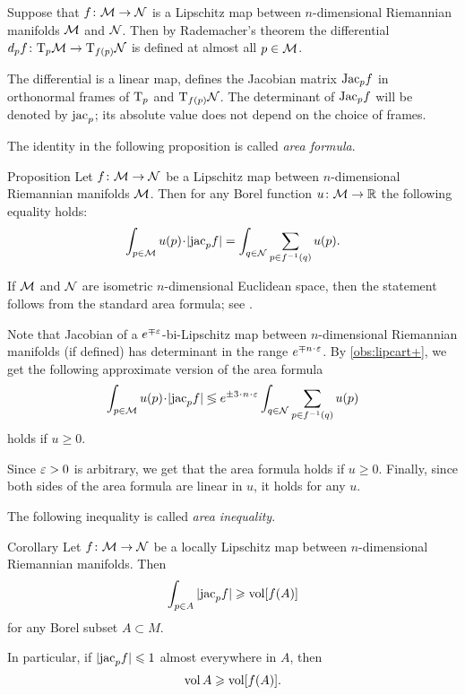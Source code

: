 Suppose that $f\colon\mathcal{M}\to\mathcal{N}$ is a Lipschitz map between $n$-dimensional Riemannian manifolds $\mathcal{M}$ and $\mathcal{N}$.
Then by Rademacher's theorem %
the differential $d_p f\colon\mathrm{T}_p\mathcal{M}\to\mathrm{T}_{f(p)}\mathcal{N}$ is defined at almost all $p\in \mathcal{M}$.

The differential is a linear map, defines the Jacobian matrix $\mathrm{Jac}_pf$ in orthonormal frames of $\mathrm{T}_p$ and $\mathrm{T}_{f(p)}\mathcal{N}$.
The determinant of $\mathrm{Jac}_pf$ will be denoted by $\mathrm{jac}_p$;
its absolute value does not depend on the choice of frames.

The identity in the following proposition is called \emph{area formula}.

\begin{thm}{Proposition}
Let $f\colon\mathcal{M}\to\mathcal{N}$ be a Lipschitz map between $n$-dimensional Riemannian manifolds $\mathcal{M}$.
Then for  any Borel function $u\:\spc{M}\z\to \RR$ the following equality holds:
\[\int_{p\in \spc{M}} u(p)\cdot |\jac_pf|=\int_{q\in \spc{N}}\sum_{p\in f^{-1}(q)} u(p).\]

\end{thm}

If $\mathcal{M}$ and $\mathcal{N}$ are isometric $n$-dimensional Euclidean space, then the statement follows from the standard area formula;
see \cite[3.2.3]{federer}.

Note that Jacobian of a $e^{\mp\varepsilon}$-bi-Lipschitz map between $n$-dimensional Riemannian manifolds (if defined) has determinant in the range $e^{\mp n\cdot\eps}$.
By \ref{obs:lipcart+}, we get the following approximate version of the area formula 
\[\int_{p\in \spc{M}} u(p)\cdot |\jac_pf|
\lege e^{\pm 3\cdot n\cdot \eps}\int_{q\in \spc{N}}\sum_{p\in f^{-1}(q)} u(p)\]
holds if $u\ge0$.

Since $\varepsilon>0$ is arbitrary, we get that the area formula holds if $u\ge 0$.
Finally, since both sides of the area formula are linear in $u$, it holds for any $u$.
\qeds

The following inequality is called \emph{area inequality}.

\begin{thm}{Corollary}\label{cor:area-inequality}
Let $f\colon\mathcal{M}\to\mathcal{N}$ be a locally Lipschitz map between $n$-dimensional Riemannian manifolds.
Then 
\[\int_{p\in A} |\mathrm{jac}_p f|\geqslant \operatorname{\rm vol}\nolimits[f(A)]\]
for any Borel subset $A\subset M$.

In particular, if $|\mathrm{jac}_p f|\leqslant 1$ almost everywhere in $A$, then 
\[\operatorname{\rm vol}\nolimits A \geqslant \operatorname{\rm vol}\nolimits[f(A)].\]
\end{thm}

